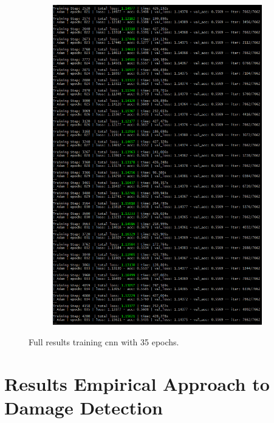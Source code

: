 \begin{figure}[H]
\begin{subfigure}{.475\textwidth}
		\label{fig:NN_C}
	\end{subfigure}
	\begin{subfigure}{.475\textwidth}
		\centering
		\includegraphics[width=.975\linewidth]{figs/TrainingClas1.png}
		\label{fig:NN_C1}
	\end{subfigure}
	\caption{\footnotesize{Full results training \ac{cnn} with 35 epochs.}}
	\label{fig:an1}
\end{figure}

\section{Results Empirical Approach to Damage Detection} \label{an:coh2}

